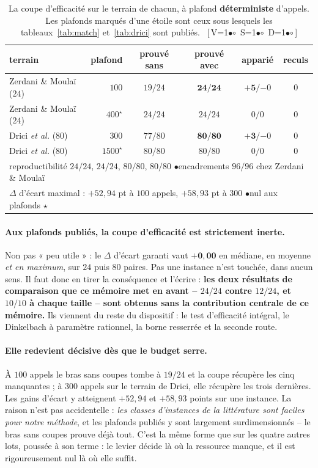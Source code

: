 \documentclass[11pt,a4paper]{article}
\theoremstyle{plain}
\theoremstyle{remark}
\newcommand{\cfgm}[1]{\ifnum#1=1$\bullet$\else$\circ$\fi}
\newcommand{\conf}[3]{%
  \textsf{\footnotesize[\,V\cfgm{#1}\ S\cfgm{#2}\ D\cfgm{#3}\,]}}
\begin{document}
\begin{table}[H]
\centering
\caption{La coupe d'efficacité sur le terrain de chacun, à plafond
\textbf{déterministe} d'appels. Les plafonds marqués d'une étoile sont ceux
sous lesquels les tableaux~\ref{tab:match} et~\ref{tab:drici} sont
publiés.\ \conf{1}{1}{1}}
\label{tab:littdeterm}
\setlength{\tabcolsep}{5pt}
\begin{tabular}{lrcccc}
\toprule
terrain & plafond & prouvé sans & prouvé avec & apparié & reculs\\
\midrule
Zerdani \& Moulaï ($24$) & $100$ & $19/24$ & $\mathbf{24/24}$
 & $\mathbf{+5}/{-0}$ & $0$\\
Zerdani \& Moulaï ($24$) & $400^{\star}$ & $24/24$ & $24/24$
 & $0/0$ & $0$\\
\midrule
Drici \emph{et al.} ($80$) & $300$ & $77/80$ & $\mathbf{80/80}$
 & $\mathbf{+3}/{-0}$ & $0$\\
Drici \emph{et al.} ($80$) & $1500^{\star}$ & $80/80$ & $80/80$
 & $0/0$ & $0$\\
\midrule
\multicolumn{6}{l}{reproductibilité $24/24$, $24/24$, $80/80$, $80/80$
 \quad$\bullet$\quad encadrements $96/96$ chez Zerdani \& Moulaï}\\
\multicolumn{6}{l}{$\Delta$ d'écart maximal : $+52{,}94$ pt à $100$ appels,
 $+58{,}93$ pt à $300$ \quad$\bullet$\quad nul aux plafonds $\star$}\\
\bottomrule
\end{tabular}
\end{table}

\paragraph{Aux plafonds publiés, la coupe d'efficacité est strictement
inerte.} Non pas « peu utile » : le $\Delta$ d'écart garanti vaut
$\mathbf{+0{,}00}$ en médiane, en moyenne \emph{et en maximum}, sur $24$
puis $80$ paires. Pas une instance n'est touchée, dans aucun sens. Il faut
donc en tirer la conséquence et l'écrire : \textbf{les deux résultats de
comparaison que ce mémoire met en avant -- $24/24$ contre $12/24$, et
$10/10$ à chaque taille -- sont obtenus sans la contribution centrale de ce
mémoire.} Ils viennent du reste du dispositif : le test d'efficacité
intégral, le Dinkelbach à paramètre rationnel, la borne resserrée et la
seconde route.

\paragraph{Elle redevient décisive dès que le budget serre.} À $100$ appels
le bras sans coupes tombe à $19/24$ et la coupe récupère les cinq
manquantes ; à $300$ appels sur le terrain de Drici, elle récupère les
trois dernières. Les gains d'écart y atteignent $+52{,}94$ et $+58{,}93$
points sur une instance. La raison n'est pas accidentelle : \emph{les
classes d'instances de la littérature sont faciles pour notre méthode}, et
les plafonds publiés y sont largement surdimensionnés -- le bras sans coupes
prouve déjà tout. C'est la même forme que sur les quatre autres lots, poussée
à son terme : le levier décide là où la ressource manque, et il est
rigoureusement nul là où elle suffit.
\end{document}
